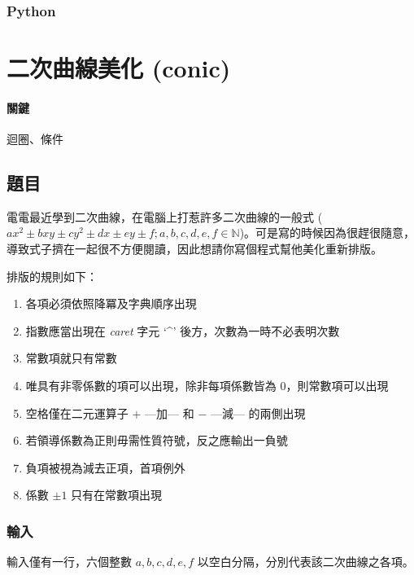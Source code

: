 \documentclass[a4paper,10pt]{article}
\begin{document}


\subsubsection{Python}



\section{二次曲線美化 (conic)}

\paragraph{關鍵} 迴圈、條件

\subsection{題目}

電電最近學到二次曲線，在電腦上打惹許多二次曲線的一般式 ($ax^2 \pm bxy \pm cy^2 \pm dx \pm ey \pm f; a, b, c, d, e, f \in \mathbb{N}$)。可是寫的時候因為很趕很隨意，導致式子擠在一起很不方便閱讀，因此想請你寫個程式幫他美化重新排版。

排版的規則如下：
\begin{enumerate}
 \item 各項必須依照降冪及字典順序出現
 \item 指數應當出現在 \textit{caret} 字元 `\enspace\textbf{\^}' 後方，次數為一時不必表明次數
 \item 常數項就只有常數
 \item 唯具有非零係數的項可以出現，除非每項係數皆為 $0$，則常數項可以出現
 \item 空格僅在二元運算子 $\mathbf{+}$ ---加--- 和 $\mathbf{-}$ ---減--- 的兩側出現
 \item 若領導係數為正則毋需性質符號，反之應輸出一負號
 \item 負項被視為減去正項，首項例外
 \item 係數 $\pm1$ 只有在常數項出現
\end{enumerate}

\subsubsection{輸入}

輸入僅有一行，六個整數 $a, b, c, d, e, f$ 以空白分隔，分別代表該二次曲線之各項。
\end{document}
